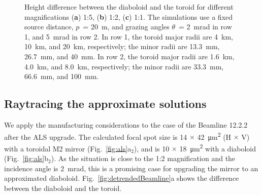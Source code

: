 \documentclass{iucr}       %
\begin{document}
\begin{figure}
\caption{Height difference between the diaboloid and the toroid for different magnifications (\textbf{a}) 1:5, (\textbf{b}) 1:2, (\textbf{c}) 1:1. The simulations use a fixed source distance, $p$~= \SI{20}{\meter}, and grazing angles $\theta$~= \SI{2}{\milli\radian} in row 1, and \SI{5}{\milli\radian} in row 2. In row 1, the toroid major radii are 4~km, 10~km, and 20~km, respectively; the minor radii are 13.3~mm, 26.7~mm, and 40~mm. In row 2, the toroid major radii are 1.6~km, 4.0~km, and 8.0~km, respectively; the minor radii are 33.3~mm, 66.6~mm, and 100~mm.}
\end{figure}

\subsection{Raytracing the approximate solutions}
We apply the manufacturing considerations to the case of the Beamline 12.2.2 after the ALS upgrade. The calculated focal spot size is 14 $\times$ \SI{42}{\micro\meter^2} (H $\times$ V) with a toroidal M2 mirror (Fig.~\ref{fig:als}a$_2$), and is 10 $\times$ \SI{18}{\micro\meter^2} with a diaboloid (Fig.~\ref{fig:als}b$_2$). As the situation is close to the 1:2 magnification and the incidence angle is \SI{2}{\milli\radian}, this is a promising case for upgrading the mirror to an approximated diaboloid. Fig.~\ref{fig:detrendedBeamline}a shows the difference between the diaboloid and the toroid. 
\end{document}
